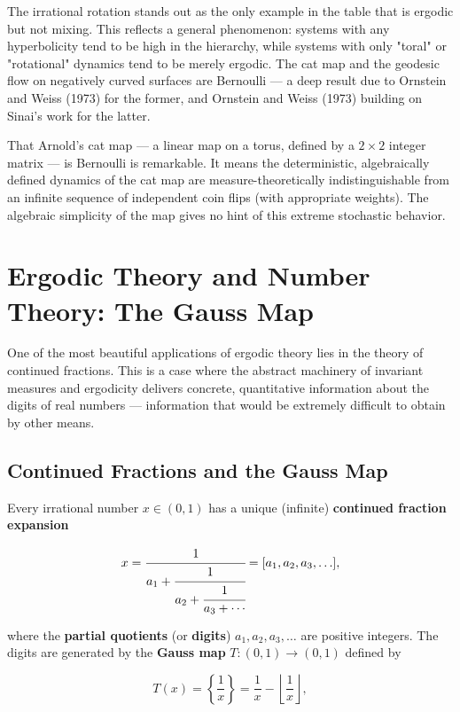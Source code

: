 \begin{remark}
The irrational rotation stands out as the only example in the table that is ergodic but not mixing. This reflects a general phenomenon: systems with any hyperbolicity tend to be high in the hierarchy, while systems with only "toral" or "rotational" dynamics tend to be merely ergodic. The cat map and the geodesic flow on negatively curved surfaces are Bernoulli --- a deep result due to Ornstein and Weiss (1973) for the former, and Ornstein and Weiss (1973) building on Sinai's work for the latter.

That Arnold's cat map --- a linear map on a torus, defined by a $2 \times 2$ integer matrix --- is Bernoulli is remarkable. It means the deterministic, algebraically defined dynamics of the cat map are measure-theoretically indistinguishable from an infinite sequence of independent coin flips (with appropriate weights). The algebraic simplicity of the map gives no hint of this extreme stochastic behavior.
\end{remark}


\section{Ergodic Theory and Number Theory: The Gauss Map}\label{sec:12.5}

One of the most beautiful applications of ergodic theory lies in the theory of continued fractions. This is a case where the abstract machinery of invariant measures and ergodicity delivers concrete, quantitative information about the digits of real numbers --- information that would be extremely difficult to obtain by other means.


\subsection{Continued Fractions and the Gauss Map}\label{sec:12.5.1}

Every irrational number $x \in (0, 1)$ has a unique (infinite) \textbf{continued fraction expansion}

\[
x = \cfrac{1}{a_1 + \cfrac{1}{a_2 + \cfrac{1}{a_3 + \cdots}}} = [a_1, a_2, a_3, \ldots],
\]

where the \textbf{partial quotients} (or \textbf{digits}) $a_1, a_2, a_3, \ldots$ are positive integers. The digits are generated by the \textbf{Gauss map} $T: (0, 1) \to (0, 1)$ defined by

\[
T(x) = \left\{\frac{1}{x}\right\} = \frac{1}{x} - \left\lfloor\frac{1}{x}\right\rfloor,
\]

